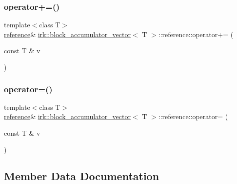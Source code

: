 \subsubsection{\texorpdfstring{operator+=()}{operator+=()}}
{\footnotesize\ttfamily template$<$class T$>$ \\
\mbox{\hyperlink{structirk_1_1block__accumulator__vector_1_1reference}{reference}}\& \mbox{\hyperlink{structirk_1_1block__accumulator__vector}{irk\+::block\+\_\+accumulator\+\_\+vector}}$<$ T $>$\+::reference\+::operator+= (\begin{DoxyParamCaption}\item[{const T \&}]{v }\end{DoxyParamCaption})\hspace{0.3cm}{\ttfamily [inline]}}

\mbox{\label{structirk_1_1block__accumulator__vector_1_1reference_aadf6da568b72eb09d89a2fd635f5ac51}} 
\subsubsection{\texorpdfstring{operator=()}{operator=()}}
{\footnotesize\ttfamily template$<$class T$>$ \\
\mbox{\hyperlink{structirk_1_1block__accumulator__vector_1_1reference}{reference}}\& \mbox{\hyperlink{structirk_1_1block__accumulator__vector}{irk\+::block\+\_\+accumulator\+\_\+vector}}$<$ T $>$\+::reference\+::operator= (\begin{DoxyParamCaption}\item[{const T \&}]{v }\end{DoxyParamCaption})\hspace{0.3cm}{\ttfamily [inline]}}



\subsection{Member Data Documentation}
\mbox{\label{structirk_1_1block__accumulator__vector_1_1reference_a4cf080599bee26c43cca95090ee6ca66}} 
